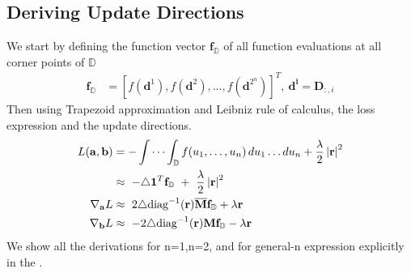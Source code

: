 \subsection{Deriving Update Directions}
We start by defining the function vector $\mathbf{f}_{\mathbb{D}}$ of all function evaluations at all corner points of $\mathbb{D}$
\begin{equation}
\begin{aligned} 
\mathbf{f}_{\mathbb{D}} &= \left[f(\mathbf{d}^{1}), f(\mathbf{d}^{2}),...,f(\mathbf{d}^{2^{n}}) \right]^{T} , ~ \mathbf{d^{i}} = \mathbf{D}_{:,i}
\label{eq:n-function}
\end{aligned}
\end{equation}
Then using Trapezoid approximation and Leibniz rule of calculus, the loss expression and the update directions.
\begin{equation}
\begin{aligned} 
L(\mathbf{a},\mathbf{b}) &= - \idotsint_\mathbb{D} f(u_1,\dots,u_n) \,du_1 \dots du_n  + \frac{\lambda}{2} \left| \mathbf{r}\right|^{2}\\ 
&\approx~ -\triangle\mathbf{1}^{T}\mathbf{f}_{\mathbb{D}} ~+~ \frac{\lambda}{2} \left| \mathbf{r}\right|^{2}\\ 
\nabla_{\mathbf{a}}L  &\approx~ 2\triangle\text{diag}^{-1}(\mathbf{r}) \overline{\mathbf{M}}\mathbf{f}_{\mathbb{D}} + \lambda \mathbf{r}\\
\nabla_{\mathbf{b}}L  &\approx~ -2\triangle\text{diag}^{-1}(\mathbf{r}) \mathbf{M}\mathbf{f}_{\mathbb{D}} - \lambda \mathbf{r}
\label{eq:n-loss-update-naive}
\end{aligned}
\end{equation}
We show all the derivations for n=1,n=2, and for general-n expression explicitly in the \supp.

